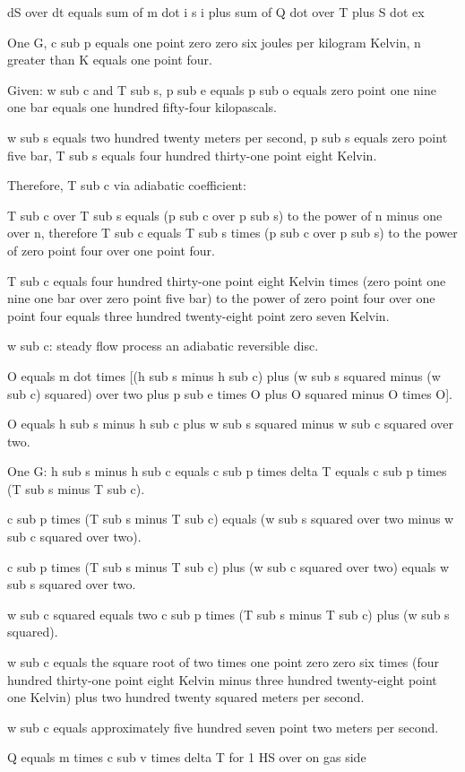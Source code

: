 dS over dt equals sum of m dot i s i plus sum of Q dot over T plus S dot ex

One G, c sub p equals one point zero zero six joules per kilogram Kelvin, n greater than K equals one point four.

Given: w sub c and T sub s, p sub e equals p sub o equals zero point one nine one bar equals one hundred fifty-four kilopascals.

w sub s equals two hundred twenty meters per second, p sub s equals zero point five bar, T sub s equals four hundred thirty-one point eight Kelvin.

Therefore, T sub c via adiabatic coefficient:

T sub c over T sub s equals (p sub c over p sub s) to the power of n minus one over n, therefore T sub c equals T sub s times (p sub c over p sub s) to the power of zero point four over one point four.

T sub c equals four hundred thirty-one point eight Kelvin times (zero point one nine one bar over zero point five bar) to the power of zero point four over one point four equals three hundred twenty-eight point zero seven Kelvin.

w sub c: steady flow process an adiabatic reversible disc.

O equals m dot times [(h sub s minus h sub c) plus (w sub s squared minus (w sub c) squared) over two plus p sub e times O plus O squared minus O times O].

O equals h sub s minus h sub c plus w sub s squared minus w sub c squared over two.

One G: h sub s minus h sub c equals c sub p times delta T equals c sub p times (T sub s minus T sub c).

c sub p times (T sub s minus T sub c) equals (w sub s squared over two minus w sub c squared over two).

c sub p times (T sub s minus T sub c) plus (w sub c squared over two) equals w sub s squared over two.

w sub c squared equals two c sub p times (T sub s minus T sub c) plus (w sub s squared).

w sub c equals the square root of two times one point zero zero six times (four hundred thirty-one point eight Kelvin minus three hundred twenty-eight point one Kelvin) plus two hundred twenty squared meters per second.

w sub c equals approximately five hundred seven point two meters per second.

Q equals m times c sub v times delta T for 1 HS over on gas side

